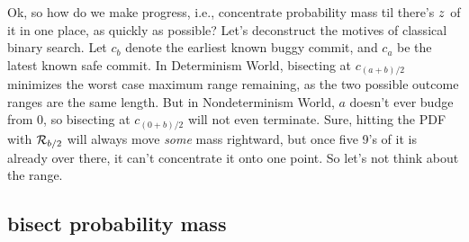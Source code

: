 \documentclass[11pt]{sigplanconf}
\begin{document}
Ok, so how do we
make progress,
i.e., concentrate probability mass til there's $z$ of it in one place,
as quickly as possible?
%
Let's deconstruct the motives of classical binary search.
Let $c_b$ denote the earliest known buggy commit, and $c_a$ be the latest known safe commit.
In Determinism World, bisecting at $c_{(a+b)/2}$
minimizes the worst case maximum range remaining,
as the two possible outcome ranges are the same length.
But in Nondeterminism World, $a$ doesn't ever budge from 0,
so bisecting at $c_{(0+b)/2}$ will not even terminate.
Sure, hitting the PDF with
$\mathcal{R}_{b/2}$
will always move {\it some} mass rightward,
but once five 9's of it is already over there,
it can't concentrate it onto one point.
So let's not think about the range.

\subsection{bisect probability mass}
\label{sec:cdfbisect}
\end{document}
